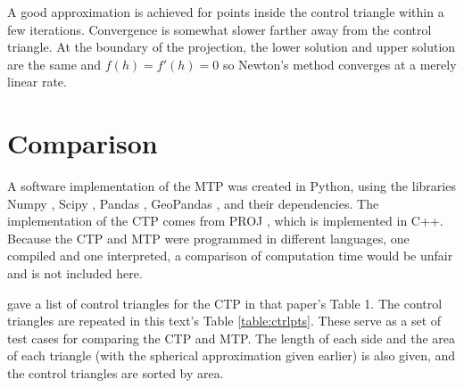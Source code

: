 \documentclass[]{interact}
\begin{document}
A good approximation is achieved for points inside the control triangle within
a few iterations. Convergence is somewhat slower farther away from the
control triangle. At the boundary of the projection,
the lower solution and upper solution are the same and $f(h)=f'(h)=0$
so Newton's method converges at a merely linear rate. \citep{burden}

\section{Comparison}
A software implementation of the MTP was created in Python, using the libraries
Numpy \citep{numpy}, Scipy \citep{scipy}, Pandas \citep{pandas}, GeoPandas
\citep{geopandas}, and their dependencies. The implementation of the CTP comes
from PROJ \citep{proj}, which is implemented in C++. %
Because the CTP and MTP were programmed in different languages,
one compiled and one interpreted, a comparison of computation time would be
unfair and is not included here. %

\citet{christensen} gave a list of control triangles for the CTP in that
paper's Table 1. The control triangles are repeated
in this text's Table \ref{table:ctrlpts}. These serve as a set of test cases for
comparing the CTP and MTP. The length of each
side and the area of each triangle (with the spherical approximation given
earlier) is also given, and the control triangles are sorted by area.
\end{document}
